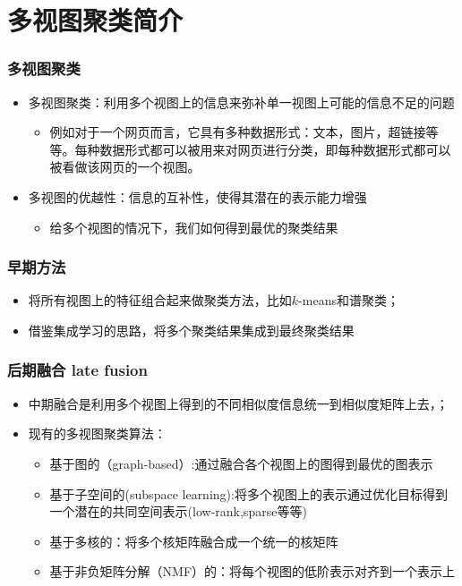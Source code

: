 \section{多视图聚类简介}


\begin{frame}
    \frametitle{多视图聚类}
    \begin{itemize}
        \item 多视图聚类：利用多个视图上的信息来弥补单一视图上可能的信息不足的问题
            \begin{itemize}
            \item 例如对于一个网页而言，它具有多种数据形式：文本，图片，超链接等等。每种数据形式都可以被用来对网页进行分类，即每种数据形式都可以被看做该网页的一个视图。


            \end{itemize}
        \item 多视图的优越性：信息的互补性，使得其潜在的表示能力增强
         \begin{itemize}
         \item 给多个视图的情况下，我们如何得到最优的聚类结果
         \end{itemize}
        \end{itemize}
\end{frame}

\begin{frame}
    \frametitle{早期方法}
    \begin{itemize}
        \item 将所有视图上的特征组合起来做聚类方法，比如$k$-means和谱聚类；
        \item 借鉴集成学习的思路，将多个聚类结果集成到最终聚类结果
    \end{itemize}
\end{frame}


\begin{frame}
    \frametitle{后期融合 late fusion}
    \begin{itemize}
        \item 中期融合是利用多个视图上得到的不同相似度信息统一到相似度矩阵上去，；
        \item 现有的多视图聚类算法：
              \begin{itemize}
                 \item 基于图的（graph-based）:通过融合各个视图上的图得到最优的图表示
                 \item 基于子空间的(subspace learning):将多个视图上的表示通过优化目标得到一个潜在的共同空间表示(low-rank,sparse等等)
                 \item 基于多核的：将多个核矩阵融合成一个统一的核矩阵
                 \item 基于非负矩阵分解（NMF）的：将每个视图的低阶表示对齐到一个表示上
              \end{itemize}

    \end{itemize}
\end{frame}


